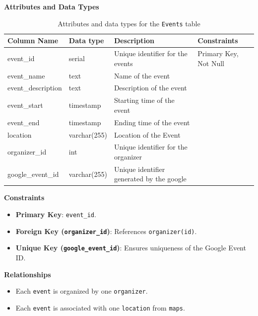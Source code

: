 \documentclass[12pt]{article}
\begin{document}
\textbf{Attributes and Data Types}
\begin{table}[H]
    \centering
    \renewcommand{\arraystretch}{1.5}
    \begin{tabular}{|l|l|p{4.5cm}|l|}
    \hline
    \rowcolor[HTML]{96FFFB} 
    \textbf{Column Name} & \textbf{Data type} & \textbf{Description}                      & \textbf{Constraints}  \\ \hline
    event\_id            & serial             & Unique identifier for the events          & Primary Key, Not Null \\ \hline
    event\_name          & text               & Name of the event                         &                       \\ \hline
    event\_description   & text               & Description of the event                  &                       \\ \hline
    event\_start         & timestamp          & Starting time of the event                &                       \\ \hline
    event\_end           & timestamp          & Ending time of the event                  &                       \\ \hline
    location             & varchar(255)       & Location of the Event                     &                       \\ \hline
    organizer\_id        & int                & Unique identifier for the organizer       &                       \\ \hline
    google\_event\_id    & varchar(255)       & Unique identifier generated by the google &                       \\ \hline
    \end{tabular}
    \caption{Attributes and data types for the \texttt{Events} table}
\end{table}

\noindent
\textbf{Constraints}
\begin{itemize}
    \item \textbf{Primary Key}: \texttt{event\_id}.
    \item \textbf{Foreign Key (\texttt{organizer\_id})}: References \texttt{organizer(id)}.
    \item \textbf{Unique Key (\texttt{google\_event\_id})}: Ensures uniqueness of the Google Event ID.
\end{itemize}


\noindent
\textbf{Relationships} 
\begin{itemize}
    \item Each \texttt{event} is organized by one \texttt{organizer}.
    \item Each \texttt{event} is associated with one \texttt{location} from \texttt{maps}.
\end{itemize}
\end{document}
